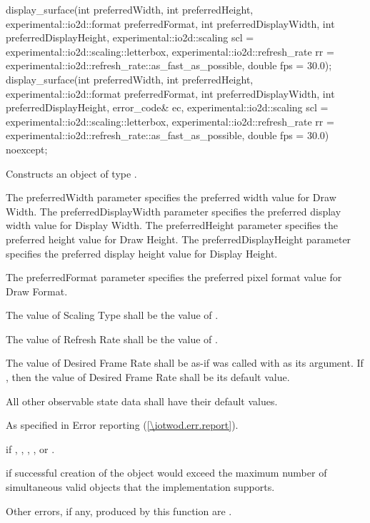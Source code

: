\begin{itemdecl}
display_surface(int preferredWidth, int preferredHeight, 
  experimental::io2d::format preferredFormat,
  int preferredDisplayWidth, int preferredDisplayHeight,
  experimental::io2d::scaling scl = experimental::io2d::scaling::letterbox,
    experimental::io2d::refresh_rate rr =
    experimental::io2d::refresh_rate::as_fast_as_possible, double fps = 30.0);
display_surface(int preferredWidth, int preferredHeight, 
  experimental::io2d::format preferredFormat,
  int preferredDisplayWidth, int preferredDisplayHeight, error_code& ec,
  experimental::io2d::scaling scl = experimental::io2d::scaling::letterbox,
    experimental::io2d::refresh_rate rr =
    experimental::io2d::refresh_rate::as_fast_as_possible, double fps = 30.0) 
  noexcept;
\end{itemdecl}
\begin{itemdescr}
\pnum
\effects
Constructs an object of type .

\pnum
The preferredWidth parameter specifies the preferred width value for Draw Width. The preferredDisplayWidth parameter specifies the preferred display width value for Display Width. The preferredHeight parameter specifies the preferred height value for Draw Height. The preferredDisplayHeight parameter specifies the preferred display height value for Display Height.

\pnum
The preferredFormat parameter specifies the preferred pixel format value for Draw Format.

\pnum
The value of Scaling Type shall be the value of .

\pnum
The value of Refresh Rate shall be the value of .

\pnum
The value of Desired Frame Rate shall be as-if  was called with  as its argument. If , then the value of Desired Frame Rate shall be its default value.

\pnum
All other observable state data shall have their default values.

\pnum
\throws
As specified in Error reporting (\ref{\iotwod.err.report}).

\pnum
\errors
{} if , , , , or .

 if successful creation of the  object would exceed the maximum number of simultaneous valid  objects that the implementation supports.

\pnum
Other errors, if any, produced by this function are .
\end{itemdescr}

